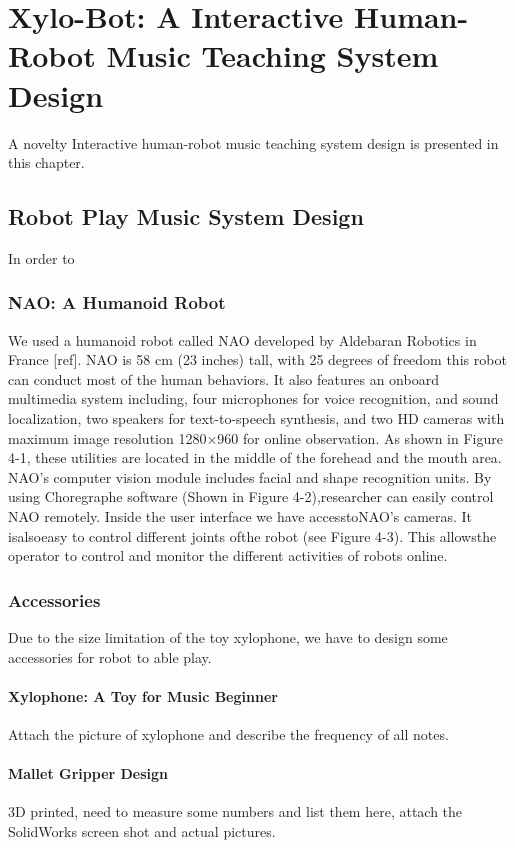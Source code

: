 \chapter{Xylo-Bot: A Interactive Human-Robot Music Teaching System Design} 
A novelty Interactive human-robot music teaching system design is presented in this chapter. 

\section{Robot Play Music System Design}
In order to 

\subsection{NAO: A Humanoid Robot}
We used a humanoid  robot called NAO developed  by Aldebaran Robotics in  France [ref].  NAO  is  58  cm  (23  inches)  tall,  with  25  degrees  of  freedom  this  robot  can  conduct most  of  the  human  behaviors.  It  also  features  an  onboard  multimedia  system  including, four  microphones  for  voice  recognition,  and  sound  localization,  two  speakers  for  text-to-speech  synthesis,  and  two  HD  cameras  with  maximum  image  resolution 1280×960 for online  observation.    As  shown  in Figure 4-1, these  utilities  are  located  in  the  middle  of the forehead  and the mouth  area.  NAO’s  computer  vision  module  includes  facial  and  shape recognition  units. 
By  using Choregraphe software (Shown  in  Figure 4-2),researcher  can  easily  control  NAO remotely.  Inside  the user interface we  have  accesstoNAO’s cameras. It  isalsoeasy  to control different  joints  ofthe robot (see  Figure 4-3). This  allowsthe  operator to  control  and monitor  the different  activities  of robots  online. 

\subsection{Accessories}
Due to the size limitation of the toy xylophone, we have to design some accessories for robot to able play.

\subsubsection{Xylophone: A Toy for Music Beginner}
Attach the picture of xylophone and describe the frequency of all notes.

\subsubsection{Mallet Gripper Design}
3D printed, need to measure some numbers and list them here, attach the SolidWorks
screen shot and actual pictures.

